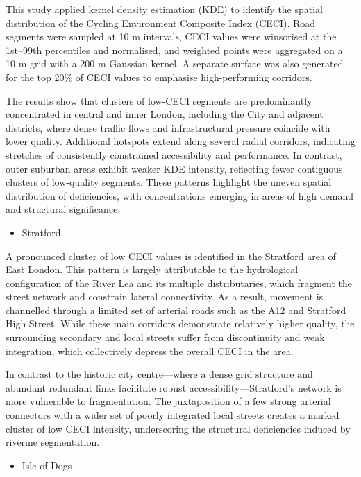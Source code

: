 \documentclass[
  12pt,
  oneside]{book}
\providecommand{\tightlist}{%
  \setlength{\itemsep}{0pt}\setlength{\parskip}{0pt}}
\begin{document}
This study applied kernel density estimation (KDE) to identify the spatial distribution of the Cycling Environment Composite Index (CECI). Road segments were sampled at 10 m intervals, CECI values were winsorised at the 1st--99th percentiles and normalised, and weighted points were aggregated on a 10 m grid with a 200 m Gaussian kernel. A separate surface was also generated for the top 20\% of CECI values to emphasise high-performing corridors.

The results show that clusters of low-CECI segments are predominantly concentrated in central and inner London, including the City and adjacent districts, where dense traffic flows and infrastructural pressure coincide with lower quality. Additional hotspots extend along several radial corridors, indicating stretches of consistently constrained accessibility and performance. In contrast, outer suburban areas exhibit weaker KDE intensity, reflecting fewer contiguous clusters of low-quality segments. These patterns highlight the uneven spatial distribution of deficiencies, with concentrations emerging in areas of high demand and structural significance.

\begin{itemize}
\tightlist
\item
  Stratford
\end{itemize}

A pronounced cluster of low CECI values is identified in the Stratford area of East London. This pattern is largely attributable to the hydrological configuration of the River Lea and its multiple distributaries, which fragment the street network and constrain lateral connectivity. As a result, movement is channelled through a limited set of arterial roads such as the A12 and Stratford High Street. While these main corridors demonstrate relatively higher quality, the surrounding secondary and local streets suffer from discontinuity and weak integration, which collectively depress the overall CECI in the area.

In contrast to the historic city centre---where a dense grid structure and abundant redundant links facilitate robust accessibility---Stratford's network is more vulnerable to fragmentation. The juxtaposition of a few strong arterial connectors with a wider set of poorly integrated local streets creates a marked cluster of low CECI intensity, underscoring the structural deficiencies induced by riverine segmentation.

\begin{itemize}
\tightlist
\item
  Isle of Dogs
\end{itemize}
\end{document}
